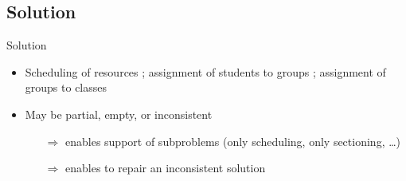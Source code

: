 \documentclass{beamer}
\begin{document}
%    

\subsection{Solution}
\begin{frame}{Solution}
    \begin{itemize}
        \item Scheduling of resources ; assignment of students to groups ; assignment of groups to classes
        \item May be partial, empty, or inconsistent
        \begin{itemize}
            \item[$\Rightarrow$] enables support of subproblems (only scheduling, only sectioning, \ldots)
            \item[$\Rightarrow$] enables to repair an inconsistent solution
        \end{itemize}
    \end{itemize}
\end{frame}
\end{document}
